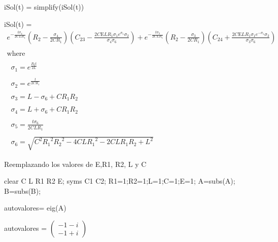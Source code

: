 \documentclass[10pt,a4paper]{article} %
\begin{document}
\begin{matlabcode}
	iSol(t) = simplify(iSol(t))
\end{matlabcode}
\begin{matlabsymbolicoutput}
	iSol(t) = 
	$\displaystyle \begin{array}{l}
	e^{-\frac{t \sigma_4 }{2 C L R_1 }}  {\left(R_2 -\frac{\sigma_4 }{2 C R_1 }\right)} {\left(C_{23} -\frac{2 C \textrm{E} L R_1  \sigma_1  e^{\sigma_5 }  \sigma_2 }{\sigma_4  \sigma_6 }\right)}+e^{-\frac{t \sigma_3 }{2 C L R_1 }}  {\left(R_2 -\frac{\sigma_3 }{2 C R_1 }\right)} {\left(C_{24} +\frac{2 C \textrm{E} L R_1  \sigma_1  e^{-\sigma_5 }  \sigma_2 }{\sigma_3  \sigma_6 }\right)}\\
	\mathrm{}\\
	\textrm{where}\\
	\mathrm{}\\
	\;\;\sigma_1 =e^{\frac{R_2  t}{2 L}} \\
	\mathrm{}\\
	\;\;\sigma_2 =e^{\frac{t}{2 C R_1 }} \\
	\mathrm{}\\
	\;\;\sigma_3 =L-\sigma_6 +C R_1  R_2 \\
	\mathrm{}\\
	\;\;\sigma_4 =L+\sigma_6 +C R_1  R_2 \\
	\mathrm{}\\
	\;\;\sigma_5 =\frac{t \sigma_6 }{2 C L R_1 }\\
	\mathrm{}\\
	\;\;\sigma_6 =\sqrt{C^2  {R_1 }^2  {R_2 }^2 -4 C L {R_1 }^2 -2 C L R_1  R_2 +L^2 }
	\end{array}$
\end{matlabsymbolicoutput}

\begin{par}
	\begin{flushleft}
		Reemplazando los valores de E,R1, R2, L y C
	\end{flushleft}
\end{par}

\begin{matlabcode}
	clear C L R1 R2 E;
	syms C1 C2;
	R1=1;R2=1;L=1;C=1;E=1;
	A=subs(A);
	B=subs(B);
\end{matlabcode}


\begin{matlabcode}
	autovalores= eig(A)
\end{matlabcode}
\begin{matlabsymbolicoutput}
	autovalores = 
	$\displaystyle \left(\begin{array}{c}
	-1-i\\
	-1+i
	\end{array}\right)$
\end{matlabsymbolicoutput}
\end{document}
